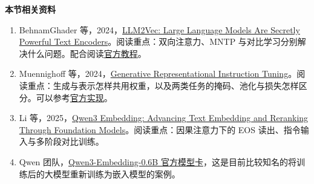 \textbf{本节相关资料}
\begin{enumerate}
    \item BehnamGhader 等，2024，\href{https://arxiv.org/abs/2404.05961}{LLM2Vec: Large Language Models Are Secretly Powerful Text Encoders}。阅读重点：双向注意力、MNTP 与对比学习分别解决什么问题。配合阅读\href{https://mcgill-nlp.github.io/llm2vec/tutorial/}{官方教程}。
    \item Muennighoff 等，2024，\href{https://arxiv.org/abs/2402.09906}{Generative Representational Instruction Tuning}。阅读重点：生成与表示怎样共用权重，以及两类任务的掩码、池化与损失怎样区分。可以参考\href{https://github.com/ContextualAI/gritlm}{官方实现}。
    \item Li 等，2025，\href{https://arxiv.org/abs/2506.05176}{Qwen3 Embedding: Advancing Text Embedding and Reranking Through Foundation Models}。阅读重点：因果注意力下的 EOS 读出、指令输入与多阶段对比训练。
    \item Qwen 团队，\href{https://huggingface.co/Qwen/Qwen3-Embedding-0.6B}{Qwen3-Embedding-0.6B 官方模型卡}，这是目前比较知名的将训练后的大模型重新训练为嵌入模型的案例。
\end{enumerate}
